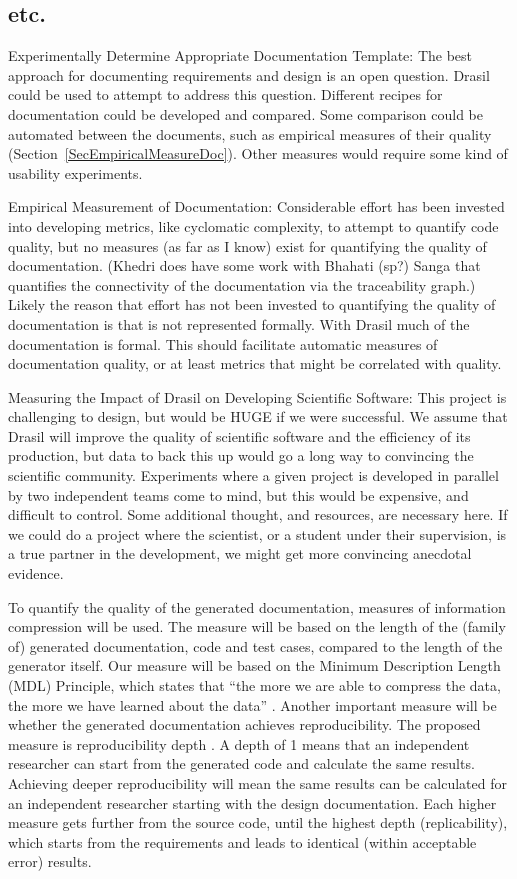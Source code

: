 \documentclass[12pt]{article}
\begin{document}
\subsection{etc.}

Experimentally Determine Appropriate Documentation Template: The best approach
for documenting requirements and design is an open question.  Drasil could be
used to attempt to address this question.  Different recipes for documentation
could be developed and compared.  Some comparison could be automated between the
documents, such as empirical measures of their quality
(Section~\ref{SecEmpiricalMeasureDoc}).  Other measures would require some kind
of usability experiments.

Empirical Measurement of Documentation: Considerable effort has been invested
into developing metrics, like cyclomatic complexity, to attempt to quantify code
quality, but no measures (as far as I know) exist for quantifying the quality of
documentation.  (Khedri does have some work with Bhahati (sp?) Sanga that
quantifies the connectivity of the documentation via the traceability graph.)
Likely the reason that effort has not been invested to quantifying the quality
of documentation is that is not represented formally.  With Drasil much of the
documentation is formal.  This should facilitate automatic measures of
documentation quality, or at least metrics that might be correlated with
quality.

Measuring the Impact of Drasil on Developing Scientific Software: This project
is challenging to design, but would be HUGE if we were successful.  We assume
that Drasil will improve the quality of scientific software and the efficiency
of its production, but data to back this up would go a long way to convincing
the scientific community.  Experiments where a given project is developed in
parallel by two independent teams come to mind, but this would be expensive, and
difficult to control.  Some additional thought, and resources, are necessary
here.  If we could do a project where the scientist, or a student under their
supervision, is a true partner in the development, we might get more convincing
anecdotal evidence.

To quantify the quality of the generated documentation, measures of information
compression will be used.  The measure will be based on the length of the
(family of) generated documentation, code and test cases, compared to the length
of the generator itself.  Our measure will be based on the Minimum Description
Length (MDL) Principle, which states that ``the more we are able to compress the
data, the more we have learned about the data'' \citep{Grunwald2004}.  Another
important measure will be whether the generated documentation achieves
reproducibility. The proposed measure is reproducibility depth
\citep{Soergel2014}.  A depth of 1 means that an independent researcher can
start from the generated code and calculate the same results.  Achieving deeper
reproducibility will mean the same results can be calculated for an independent
researcher starting with the design documentation.  Each higher measure gets
further from the source code, until the highest depth (replicability), which
starts from the requirements and leads to identical (within acceptable error)
results.
\end{document}
